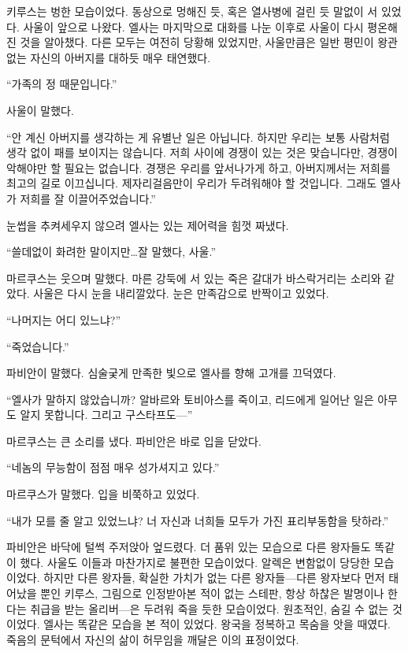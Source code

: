 키루스는 벙한 모습이었다. 동상으로 멍해진 듯, 혹은 열사병에 걸린 듯 말없이 서 있었다. 사울이 앞으로 나왔다. 엘사는 마지막으로 대화를 나눈 이후로 사울이 다시 평온해진 것을 알아챘다. 다른 모두는 여전히 당황해 있었지만, 사울만큼은 일반 평민이 왕관 없는 자신의 아버지를 대하듯 매우 태연했다.

``가족의 정 때문입니다.''

사울이 말했다.

``안 계신 아버지를 생각하는 게 유별난 일은 아닙니다. 하지만 우리는 보통 사람처럼 생각 없이 패를 보이지는 않습니다. 저희 사이에 경쟁이 있는 것은 맞습니다만, 경쟁이 악해야만 할 필요는 없습니다. 경쟁은 우리를 앞서나가게 하고, 아버지께서는 저희를 최고의 길로 이끄십니다. 제자리걸음만이 우리가 두려워해야 할 것입니다. 그래도 엘사가 저희를 잘 이끌어주었습니다.''

눈썹을 추켜세우지 않으려 엘사는 있는 제어력을 힘껏 짜냈다.

``쓸데없이 화려한 말이지만\ldots 잘 말했다, 사울.''

마르쿠스는 웃으며 말했다. 마른 강둑에 서 있는 죽은 갈대가 바스락거리는 소리와 같았다. 사울은 다시 눈을 내리깔았다. 눈은 만족감으로 반짝이고 있었다.

``나머지는 어디 있느냐?''

``죽었습니다.''

파비안이 말했다. 심술궂게 만족한 빛으로 엘사를 향해 고개를 끄덕였다.

``엘사가 말하지 않았습니까? 알바르와 토비아스를 죽이고, 리드에게 일어난 일은 아무도 알지 못합니다. 그리고 구스타프도—''

마르쿠스는 큰 소리를 냈다. 파비안은 바로 입을 닫았다.

``네놈의 무능함이 점점 매우 성가셔지고 있다.''

마르쿠스가 말했다. 입을 비쭉하고 있었다.

``내가 모를 줄 알고 있었느냐? 너 자신과 너희들 모두가 가진 표리부동함을 탓하라.''

파비안은 바닥에 털썩 주저앉아 엎드렸다. 더 품위 있는 모습으로 다른 왕자들도 똑같이 했다. 사울도 이들과 마찬가지로 불편한 모습이었다. 알렉은 변함없이 당당한 모습이었다. 하지만 다른 왕자들, 확실한 가치가 없는 다른 왕자들—다른 왕자보다 먼저 태어났을 뿐인 키루스, 그림으로 인정받아본 적이 없는 스테판, 항상 하찮은 발명이나 한다는 취급을 받는 올리버—은 두려워 죽을 듯한 모습이었다. 원초적인, 숨길 수 없는 것이었다. 엘사는 똑같은 모습을 본 적이 있었다. 왕국을 정복하고 목숨을 앗을 때였다. 죽음의 문턱에서 자신의 삶이 허무임을 깨달은 이의 표정이었다.


